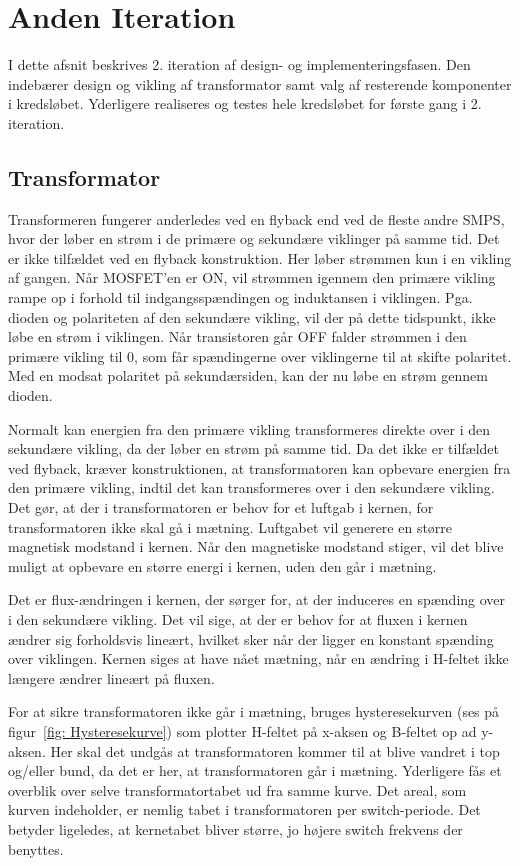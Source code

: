 \chapter{Anden Iteration}
I dette afsnit beskrives 2. iteration af design- og implementeringsfasen. Den indebærer design og vikling af transformator samt valg af resterende komponenter i kredsløbet. Yderligere realiseres og testes hele kredsløbet for første gang i 2. iteration.

\section{Transformator}
Transformeren fungerer anderledes ved en flyback end ved de fleste andre SMPS, hvor der løber en strøm i de primære og sekundære viklinger på samme tid. Det er ikke tilfældet ved en flyback konstruktion. Her løber strømmen kun i en vikling af gangen. Når MOSFET’en er ON, vil strømmen igennem den primære vikling rampe op i forhold til indgangsspændingen og induktansen i viklingen. Pga. dioden og polariteten af den sekundære vikling, vil der på dette tidspunkt, ikke løbe en strøm i viklingen. Når transistoren går OFF falder strømmen i den primære vikling til 0, som får spændingerne over viklingerne til at skifte polaritet. Med en modsat polaritet på sekundærsiden, kan der nu løbe en strøm gennem dioden\cite{transformator-design}. 


Normalt kan energien fra den primære vikling transformeres direkte over i den sekundære vikling, da der løber en strøm på samme tid. Da det ikke er tilfældet ved flyback, kræver konstruktionen, at transformatoren kan opbevare energien fra den primære vikling, indtil det kan transformeres over i den sekundære vikling. Det gør, at der i transformatoren er behov for et luftgab i kernen, for transformatoren ikke skal gå i mætning. Luftgabet vil generere en større magnetisk modstand i kernen. Når den magnetiske modstand stiger, vil det blive muligt at opbevare en større energi i kernen, uden den går i mætning. 


Det er flux-ændringen i kernen, der sørger for, at der induceres en spænding over i den sekundære vikling. Det vil sige, at der er behov for at fluxen i kernen ændrer sig forholdsvis lineært, hvilket sker når der ligger en konstant spænding over viklingen. Kernen siges at have nået mætning, når en ændring i H-feltet ikke længere ændrer lineært på fluxen. 


For at sikre transformatoren ikke går i mætning, bruges hysteresekurven (ses på figur~\ref{fig: Hysteresekurve}) som plotter H-feltet på x-aksen og B-feltet op ad y-aksen. Her skal det undgås at transformatoren kommer til at blive vandret i top og/eller bund, da det er her, at transformatoren går i mætning. Yderligere fås et overblik over selve transformatortabet ud fra samme kurve. Det areal, som kurven indeholder, er nemlig tabet i transformatoren per switch-periode. Det betyder ligeledes, at kernetabet bliver større, jo højere switch frekvens der benyttes. 

